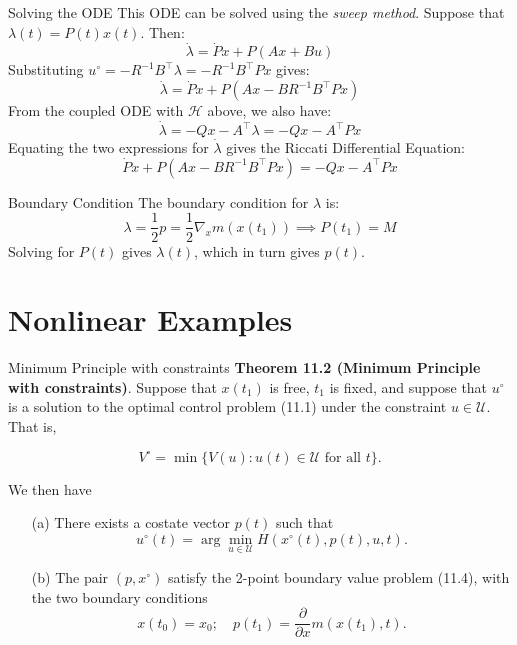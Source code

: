 \documentclass[10pt]{beamer}
\begin{document}
\begin{frame}[fragile]{Solving the ODE}
  This ODE can be solved using the \textit{sweep method}. Suppose that \( \lambda(t) = P(t)x(t) \). Then:
  \[
  \dot{\lambda} = \dot{P} x + P (Ax + Bu)
  \]
  Substituting \( u^\circ = -R^{-1} B^{\top} \lambda = -R^{-1} B^{\top} P x \) gives:
  \[
  \dot{\lambda} = \dot{P} x + P (Ax - BR^{-1} B^{\top} P x)
  \]
  From the coupled ODE with \(\mathcal{H}\) above, we also have:
  \[
  \dot{\lambda} = -Qx - A^{\top} \lambda = -Qx - A^{\top} P x
  \]
  Equating the two expressions for \( \dot{\lambda} \) gives the Riccati Differential Equation:
  \[
  \dot{P} x + P (Ax - BR^{-1} B^{\top} P x) = -Qx - A^{\top} P x
  \]
\end{frame}

\begin{frame}[fragile]{Boundary Condition}
  The boundary condition for \( \lambda \) is:
  \[
  \lambda = \frac{1}{2} p = \frac{1}{2} \nabla_x m(x(t_1)) \implies P(t_1) = M
  \]
  Solving for \( P(t) \) gives \( \lambda(t) \), which in turn gives \( p(t) \).
\end{frame}

\section{Nonlinear Examples}

\begin{frame}[fragile]{Minimum Principle with constraints}
  \textbf{Theorem 11.2 (Minimum Principle with constraints)}. Suppose that \( x(t_1) \) is free, \( t_1 \) is fixed, and suppose that \( u^\circ \) is a solution to the optimal control problem (11.1) under the constraint \( u \in \mathcal{U} \). That is,

  \[ V^\circ = \min \{ V(u) : u(t) \in \mathcal{U} \text{ for all } t \}. \]
  
  We then have
  
  \begin{itemize}
      \item[(a)] There exists a costate vector \( p(t) \) such that
      \[
      u^\circ (t) = \arg \min_{u \in \mathcal{U}} H(x^\circ (t), p(t), u, t).
      \]
  
      \item[(b)] The pair \( (p, x^\circ) \) satisfy the 2-point boundary value problem (11.4), with the two boundary conditions
      \[
      x(t_0) = x_0; \quad p(t_1) = \frac{\partial}{\partial x} m(x(t_1), t).
      \]
  \end{itemize}
\end{frame}
  
\end{document}
